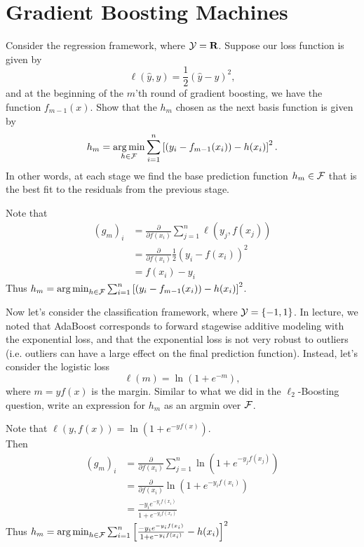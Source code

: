 \documentclass[12pt,letterpaper]{article}
\begin{document}
\section*{Gradient Boosting Machines}
\begin{problem}{7.1}
    Consider the regression framework, where $\mathcal{Y}=\mathbf{R}$. Suppose our
    loss function is given by 
    \[
    \ell(\hat{y},y)=\frac{1}{2}\left(\hat{y}-y\right)^{2},
    \]
    and at the beginning of the $m$'th round of gradient boosting, we
    have the function $f_{m-1}(x)$. Show that the $h_{m}$ chosen as
    the next basis function is given by 
    \[
    h_{m}=\argmin_{h\in\cf}\sum_{i=1}^{n}\left[\left(y_{i}-f_{m-1}(x_{i})\right)-h(x_{i})\right]^{2}.
    \]
    In other words, at each stage we find the base prediction function
    $h_{m}\in\mathcal{F}$ that is the best fit to the residuals from the previous
    stage.
\end{problem}
\begin{solution}{}
    Note that
    \begin{align*}
        (g_m)_i &= \frac{\partial}{\partial f(x_i)} \sum_{j=1}^n \ell(y_j, f(x_j))\\
        &= \frac{\partial}{\partial f(x_i)} \frac{1}{2} (y_i - f(x_i))^2\\
        &= f(x_i) - y_i
    \end{align*}
    Thus $h_{m}=\argmin_{h\in\cf}\sum_{i=1}^{n}\left[\left(y_{i}-f_{m-1}(x_{i})\right)-h(x_{i})\right]^{2}$.
\end{solution}
\newpage

\begin{problem}{7.2}
    Now let's consider the classification framework, where $\mathcal{Y}=\left\{ -1,1\right\} $.
    In lecture, we noted that AdaBoost corresponds to forward stagewise
    additive modeling with the exponential loss, and that the exponential
    loss is not very robust to outliers (i.e. outliers can have a large
    effect on the final prediction function). Instead, let's consider
    the logistic loss 
    \[
    \ell(m)=\ln\left(1+e^{-m}\right),
    \]
    where $m=yf(x)$ is the margin. Similar to what we did in the $\ell_{2}$-Boosting
    question, write an expression for $h_{m}$ as an argmin over $\mathcal{F}$.
\end{problem}
\begin{solution}{}
    Note that $\ell(y, f(x))=\ln\left(1+e^{-yf(x)}\right)$.\\
    Then
    \begin{align*}
        (g_m)_i &= \frac{\partial}{\partial f(x_i)} \sum_{j=1}^n \ln\left(1+e^{-y_jf(x_j)}\right)\\
        &= \frac{\partial}{\partial f(x_i)} \ln\left(1+e^{-y_if(x_i)}\right)\\
        &= \frac{-y_i e^{-y_if(x_i)}}{1+e^{-y_if(x_i)}}
    \end{align*}
    Thus $h_{m}=\argmin_{h\in\cf}\sum_{i=1}^{n}\left[\frac{-y_i e^{-y_if(x_i)}}{1+e^{-y_if(x_i)}}-h(x_{i})\right]^{2}$
\end{solution}
\end{document}

